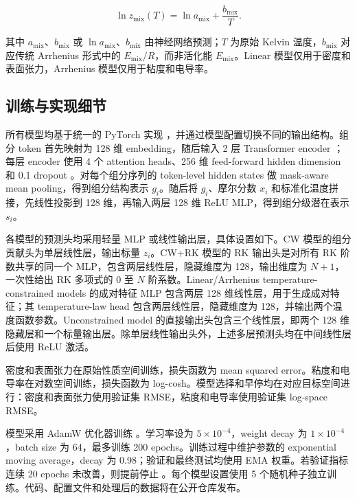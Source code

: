 \documentclass[journal=jctcce,manuscript=article,doi=true]{achemso}
\begin{document}
\[
\ln z_{\mathrm{mix}}(T)=\ln a_{\mathrm{mix}}+\frac{b_{\mathrm{mix}}}{T}.
\tag{12}
\]

\noindent 其中 \(a_{\mathrm{mix}}\)、\(b_{\mathrm{mix}}\) 或 \(\ln a_{\mathrm{mix}}\)、\(b_{\mathrm{mix}}\) 由神经网络预测；\(T\) 为原始 Kelvin 温度，\(b_{\mathrm{mix}}\) 对应传统 Arrhenius 形式中的 \(E_{\mathrm{mix}}/R\)，而非活化能 \(E_{\mathrm{mix}}\)。Linear 模型仅用于密度和表面张力，Arrhenius 模型仅用于粘度和电导率。

\subsection{训练与实现细节}\label{ux8badux7ec3ux4e0eux5b9eux73b0ux7ec6ux8282}

所有模型均基于统一的 PyTorch 实现 \cite{paszke2019pytorch}，并通过模型配置切换不同的输出结构。组分 token 首先映射为 128 维 embedding，随后输入 2 层 Transformer encoder \cite{vaswani2017attention}；每层 encoder 使用 4 个 attention heads、256 维 feed-forward hidden dimension 和 0.1 dropout \cite{srivastava2014dropout}。对每个组分序列的 token-level hidden states 做 mask-aware mean pooling，得到组分结构表示 \(g_i\)。随后将 \(g_i\)、摩尔分数 \(x_i\) 和标准化温度拼接，先线性投影到 128 维，再输入两层 128 维 ReLU MLP，得到组分级潜在表示 \(s_i\)。

各模型的预测头均采用轻量 MLP 或线性输出层，具体设置如下。CW 模型的组分贡献头为单层线性层，输出标量 \(z_i\)。CW+RK 模型的 RK 输出头是对所有 RK 阶数共享的同一个 MLP，包含两层线性层，隐藏维度为 128，输出维度为 \(N+1\)，一次性给出 RK 多项式的 0 至 \(N\) 阶系数。Linear/Arrhenius temperature-constrained models 的成对特征 MLP 包含两层 128 维线性层，用于生成成对特征；其 temperature-law head 包含两层线性层，隐藏维度为 128，并输出两个温度函数参数。Unconstrained model 的直接输出头包含三个线性层，即两个 128 维隐藏层和一个标量输出层。除单层线性输出头外，上述多层预测头均在中间线性层后使用 ReLU 激活。

密度和表面张力在原始性质空间训练，损失函数为 mean squared error。粘度和电导率在对数空间训练，损失函数为 log-cosh。模型选择和早停均在对应目标空间进行：密度和表面张力使用验证集 RMSE，粘度和电导率使用验证集 log-space RMSE。

模型采用 AdamW 优化器训练 \cite{loshchilov2019decoupled,kingma2015adam}。学习率设为 \(5\times10^{-4}\)，weight decay 为 \(1\times10^{-4}\)，batch size 为 64，最多训练 200 epochs。训练过程中维护参数的 exponential moving average，decay 为 0.98；验证和最终测试均使用 EMA 权重。若验证指标连续 20 epochs 未改善，则提前停止 \cite{prechelt1998early}。每个模型设置使用 5 个随机种子独立训练。代码、配置文件和处理后的数据将在公开仓库发布。
\end{document}
